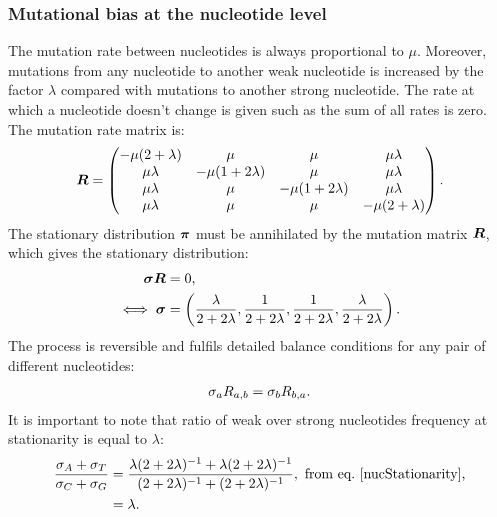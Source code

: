 \subsubsection{Mutational bias at the nucleotide level}
\label{sec-mut-bias:mut-matrix}
The mutation rate between nucleotides is always proportional to $\mu$.
Moreover, mutations from any nucleotide to another weak nucleotide is increased by the factor $\lambda$ compared with mutations to another strong nucleotide.
The rate at which a nucleotide doesn't change is given such as the sum of all rates is zero.
The mutation rate matrix is:
\begin{equation}
    \label{nucMatrix}
    \bm{R} =
    \begin{pmatrix}
    {-\mu(2 + \lambda)}
        & {\mu} & {\mu} & {\mu \lambda} \\
        {\mu \lambda} & {-\mu(1 + 2\lambda)} & {\mu} & {\mu \lambda} \\
        {\mu \lambda} & {\mu} & {-\mu(1 + 2\lambda)} & {\mu \lambda} \\
        {\mu \lambda} & {\mu} & {\mu} & {-\mu(2 + \lambda)}
    \end{pmatrix}.
\end{equation}
The stationary distribution $ \bm{\pi}$ must be annihilated by the mutation matrix $\bm{R}$, which gives the stationary distribution:
\begin{align}
    \bm{\sigma} \bm{R} & = 0, \\
    \iff \bm{\sigma} & = \left( \dfrac{\lambda}{2+2\lambda}, \dfrac{1}{2+2\lambda}, \dfrac{1}{2+2\lambda}, \dfrac{\lambda}{2+2\lambda} \right).
    \label{nucStationarity}
\end{align}
The process is reversible and fulfils detailed balance conditions for any pair of different nucleotides:
\begin{align}
    \sigma_a R_{a, b} =\sigma_b R_{b, a}.
    \label{nucMutBalance}
\end{align}
It is important to note that ratio of weak over strong nucleotides frequency at stationarity is equal to $\lambda$:
\begin{align}
    \label{lambda}
    \dfrac{ \mutequi_A + \mutequi_T }{ \mutequi_C + \mutequi_G }
    & = \dfrac{ \lambda ( 2 + 2 \lambda)^{-1} + \lambda ( 2 + 2 \lambda)^{-1}}{ ( 2 + 2 \lambda)^{-1} + ( 2 + 2 \lambda)^{-1}}, \ \textrm{from eq.~\ref{nucStationarity},}\\
    & = \lambda.
\end{align}

